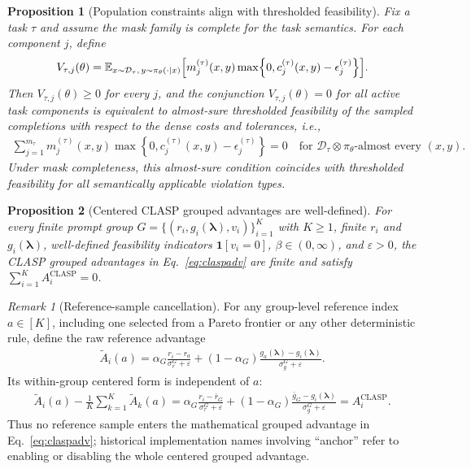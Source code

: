 \documentclass{article}
\newtheorem{proposition}{Proposition}
\theoremstyle{remark}
\newtheorem{remark}{Remark}
\begin{document}
\begin{proposition}[Population constraints align with thresholded feasibility]
\label{prop:population-feasibility}
Fix a task \(\tau\) and assume the mask family is complete for the task semantics. For each component \(j\), define
\begin{align}
V_{\tau,j}(\theta)
=
\mathbb{E}_{x\sim\mathcal D_\tau,\,y\sim\pi_\theta(\cdot\mid x)}
\Bigl[m_j^{(\tau)}(x,y)\max\!\left\{0,c_j^{(\tau)}(x,y)-\epsilon_j^{(\tau)}\right\}\Bigr].
\end{align}
Then \(V_{\tau,j}(\theta)\ge 0\) for every \(j\), and the conjunction \(V_{\tau,j}(\theta)=0\) for all active task components is equivalent to almost-sure thresholded feasibility of the sampled completions with respect to the dense costs and tolerances, i.e.,
\begin{align}
\sum_{j=1}^{m_\tau} m_j^{(\tau)}(x,y)\max\!\left\{0,c_j^{(\tau)}(x,y)-\epsilon_j^{(\tau)}\right\}=0
\quad \text{for } \mathcal D_\tau\otimes\pi_\theta\text{-almost every }(x,y).
\end{align}
Under mask completeness, this almost-sure condition coincides with thresholded feasibility for all semantically applicable violation types.
\end{proposition}

\begin{proposition}[Centered CLASP grouped advantages are well-defined]
\label{prop:clasp-well-defined}
For every finite prompt group \(G=\{(r_i,g_i(\boldsymbol{\lambda}),v_i)\}_{i=1}^K\) with \(K \ge 1\), finite \(r_i\) and \(g_i(\boldsymbol{\lambda})\), well-defined feasibility indicators \(\mathbf{1}[v_i=0]\), \(\beta\in(0,\infty)\), and \(\varepsilon>0\), the CLASP grouped advantages in Eq.~\eqref{eq:claspadv} are finite and satisfy \(\sum_{i=1}^K A_i^{\mathrm{CLASP}}=0\).
\end{proposition}

\begin{remark}[Reference-sample cancellation]
\label{rem:reference-cancellation}
For any group-level reference index \(a\in[K]\), including one selected from a Pareto frontier or any other deterministic rule, define the raw reference advantage
\begin{align}
\widetilde A_i(a)
=
\alpha_G\frac{r_i-r_a}{\sigma_r^G+\varepsilon}
+
(1-\alpha_G)\frac{g_a(\boldsymbol{\lambda})-g_i(\boldsymbol{\lambda})}{\sigma_g^G+\varepsilon}.
\end{align}
Its within-group centered form is independent of \(a\):
\begin{align}
\widetilde A_i(a)
-
\frac{1}{K}\sum_{k=1}^K\widetilde A_k(a)
=
\alpha_G\frac{r_i-\bar r_G}{\sigma_r^G+\varepsilon}
+
(1-\alpha_G)\frac{\bar g_G-g_i(\boldsymbol{\lambda})}{\sigma_g^G+\varepsilon}
=
A_i^{\mathrm{CLASP}}.
\end{align}
Thus no reference sample enters the mathematical grouped advantage in Eq.~\eqref{eq:claspadv}; historical implementation names involving ``anchor'' refer to enabling or disabling the whole centered grouped advantage.
\end{remark}
\end{document}
